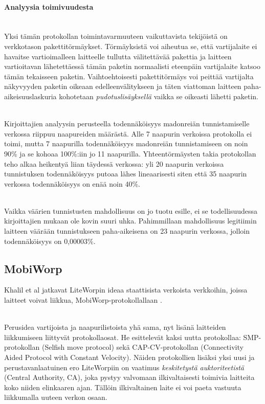 \documentclass[finnish]{tktltiki2}
\theoremstyle{definition}
\theoremstyle{remark}
\begin{document}
\paragraph{Analyysia toimivuudesta}
\noindent \\
Yksi tämän protokollan toimintavarmuuteen vaikuttavista tekijöistä on verkkotason pakettitörmäykset. Törmäyksistä voi aiheutua se, että vartijalaite ei havaitse vartioimalleen laitteelle tullutta välitettävää pakettia ja laitteen vartioitavan lähetettäessä tämän paketin normaalisti eteenpäin vartijalaite katsoo tämän tekaisseen paketin. Vaihtoehtoisesti pakettitörmäys voi peittää vartijalta näkyvyyden paketin oikeaan edelleenvälitykseen ja täten viattoman laitteen paha-aikeisuuslaskuria kohotetaan \emph{pudotuslisäyksellä} vaikka se oikeasti lähetti paketin.

\noindent \\
Kirjoittajien analyysin perusteella todennäköisyys madonreiän tunnistamiselle verkossa riippuu naapureiden määrästä. Alle 7 naapurin verkoissa protokolla ei toimi, mutta 7 naapurilla todennäköisyys madonreiän tunnistamiseen on noin 90\% ja se kohoaa 100\%:iin jo 11 naapurilla. Yhteentörmäysten takia protokollan teho alkaa heikentyä liian täydessä verkossa: yli 20 naapurin verkoissa tunnistuksen todennäköisyys putoaa lähes lineaarisesti siten että 35 naapurin verkossa todennäköisyys on enää noin 40\%.

\noindent \\
Vaikka väärien tunnistusten mahdollisuus on jo tuotu esille, ei se todellisuudessa kirjoittajien mukaan ole kovin suuri uhka. Pahimmillaan mahdollisuus legitiimin laitteen väärään tunnistukseen paha-aikeisena on 23 naapurin verkossa, jolloin todennäköisyys on 0,00003\%.

% 
% 
% 
% 
% 
% 
% 
% 
% 
% 
% 
% 
\subsection{MobiWorp}
% 
% 
% 
% 
% 
% 
% 
% 
% 
% 
% 
% 

Khalil et al jatkavat LiteWorpin ideaa staattisista verkoista verkkoihin, joissa laitteet voivat liikkua, MobiWorp-protokollallaan \cite{mobiworp}.

\noindent \\
Perusidea vartijoista ja naapurilistoista yhä sama, nyt lisänä laitteiden liikkumiseen liittyvät protokollaosat. He esittelevät kaksi uutta protokollaa: SMP-protokollan (Selfish move protocol) sekä CAP-CV-protokollan (Connectivity Aided Protocol with Constant Velocity). Näiden protokollien lisäksi yksi uusi ja perustavanlaatuinen ero LiteWorpiin on vaatimus \emph{keskitetystä auktoriteetistä} (Central Authority, CA), joka pystyy valvomaan ilkivaltaisesti toimivia laitteita koko niiden elinkaaren ajan. Tällöin ilkivaltainen laite ei voi paeta vastuuta liikkumalla uuteen verkon osaan.
\end{document}
